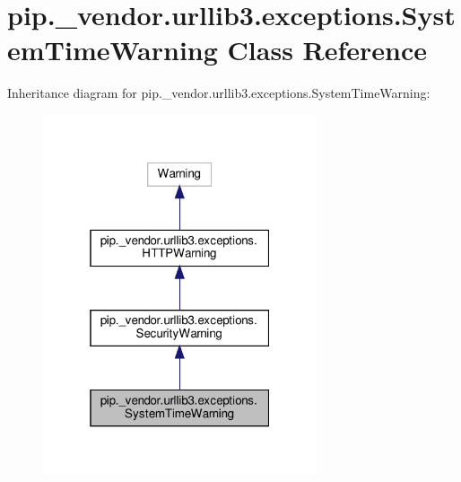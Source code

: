 \hypertarget{classpip_1_1__vendor_1_1urllib3_1_1exceptions_1_1SystemTimeWarning}{}\section{pip.\+\_\+vendor.\+urllib3.\+exceptions.\+System\+Time\+Warning Class Reference}
\label{classpip_1_1__vendor_1_1urllib3_1_1exceptions_1_1SystemTimeWarning}


Inheritance diagram for pip.\+\_\+vendor.\+urllib3.\+exceptions.\+System\+Time\+Warning\+:
\nopagebreak
\begin{figure}[H]
\begin{center}
\leavevmode
\includegraphics[width=229pt]{classpip_1_1__vendor_1_1urllib3_1_1exceptions_1_1SystemTimeWarning__inherit__graph}
\end{center}
\end{figure}


